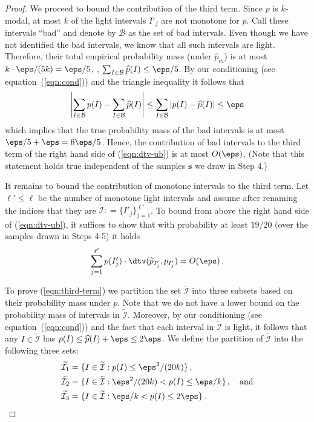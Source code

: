 \begin{proof}
We proceed to bound the contribution of the third term. Since $p$ is $k$-modal,
at most $k$ of the light intervals $I'_j$ are not monotone for $p$. Call
these intervals ``bad'' and denote by $\mathcal{B}$ as the set of bad intervals.
Even though we have not identified the bad intervals, we know that all such
intervals are light. Therefore, {their total empirical probability mass (under $\widehat{p}_m$)
is at most $k \cdot \eps/(5k) = \eps/5$, \ie, $\sum_{I \in \mathcal{B}} \widehat{p}(I) \le \eps/5$. 
By our conditioning  {(see equation~(\ref{eqn:cond}))} and the triangle inequality it follows that 
$$\left|  \sum_{I \in \mathcal{B}} p(I)  -  \sum_{I \in \mathcal{B}} \widehat{p}(I)  \right|  \le   \sum_{I \in \mathcal{B}} \left| p(I) - \widehat{p}(I)  \right| \le \eps$$
which implies that the true probability mass of the bad intervals is at most $\eps/5+\eps = 6\eps/5$.
Hence, the contribution of bad intervals to the third term of the right hand side of (\ref{eqn:dtv-ub}) is at
most $O(\eps)$.}  (Note that this statement holds true independent of the
samples $\mathbf{s}$ we draw in Step 4.) 

It remains to bound the contribution of monotone intervals to the third term.
Let $\ell' \leq \ell$ be the number of monotone light intervals and
assume after renaming the indices that they are $\widetilde{\mathcal{I}} : = \{I'_j\}_{j=1}^{\ell'}$.
To bound from above the right hand side of (\ref{eqn:dtv-ub}), it suffices to show that with probability
at least $19/20$ (over the samples drawn in Steps 4-5) it holds
\begin{equation} \label{eqn:third-term}
\sum_{j=1}^{\ell'} p(I'_j) \cdot \dtv (\widetilde{p}_{I'_j}, p_{I'_j}) = O(\eps)\,.
\end{equation}


{\noindent To prove (\ref{eqn:third-term}) we
partition the set $\widetilde{\mathcal{I}}$  {into} three subsets based on their probability mass under $p$. 
Note that we do not have a lower bound
on the probability mass of intervals in $\widetilde{\mathcal{I}}$.
Moreover, by our conditioning  {(see equation~(\ref{eqn:cond}))} and  {the fact that each interval in $\widetilde{\mathcal{I}}$ is light,} it follows that any $I \in \widetilde{\mathcal{I}}$ has 
$p(I) \le \widehat{p}(I)+\eps \le 2\eps$. We define the partition of $\widetilde{\mathcal{I}}$ into the following three sets:
\begin{align*}
  \widetilde{\mathcal{I}_1} &= \{ I \in  \widetilde{\mathcal{I}}: p(I) \le \eps^2/(20k)\}\,,\\
  \widetilde{\mathcal{I}_2} &= \{ I \in  \widetilde{\mathcal{I}}: \eps^2/(20k) < p(I) \le \eps/k\}\,,\quad\text{and}\\
\widetilde{\mathcal{I}_3} &= \{ I \in  \widetilde{\mathcal{I}}:
                            \eps/k < p(I) \le  2\eps \}\,.
\end{align*} 

}
\end{proof}
